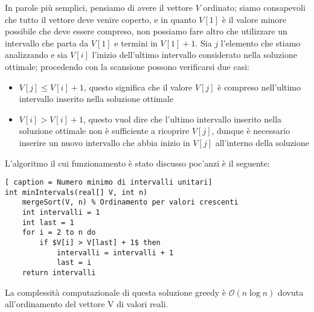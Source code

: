 \documentclass[../cheatSheetAlgoritmi.tex]{subfiles}
\begin{document}
In parole più semplici, pensiamo di avere il vettore $V$ ordinato; siamo consapevoli che tutto il vettore deve venire coperto, e in quanto $V[1]$ è il valore minore possibile che deve essere compreso, non possiamo fare altro che utilizzare un intervallo che parta da $V[1]$ e termini in $V[1] + 1$. Sia $j$ l'elemento che stiamo analizzando e sia $V[i]$ l'inizio dell'ultimo intervallo considerato nella soluzione ottimale; procedendo con la scansione possono verificarsi due casi:
\begin{itemize}
	\item $V[j] \leq V[i] + 1$, questo significa che il valore $V[j]$ è compreso nell'ultimo intervallo inserito nella soluzione ottimale
	\item $V[i] > V[i] + 1$, questo vuol dire che l'ultimo intervallo inserito nella soluzione ottimale non è sufficiente a ricoprire $V[j]$, dunque è necessario inserire un nuovo intervallo che abbia inizio in $V[j]$ all'interno della soluzione
\end{itemize}
L'algoritmo il cui funzionamento è stato discusso poc'anzi è il seguente:
\begin{lstlisting}[ caption = Numero minimo di intervalli unitari]
int minIntervals(real[] V, int n)
	mergeSort(V, n) % Ordinamento per valori crescenti
	int intervalli = 1
	int last = 1
	for i = 2 to n do
		if $V[i] > V[last] + 1$ then
			intervalli = intervalli + 1
			last = i
	return intervalli
\end{lstlisting}
La complessità computazionale di questa soluzione greedy è $\mathcal{O}(n \log n)$ dovuta all'ordinamento del vettore V di valori reali.
\newpage
\end{document}
